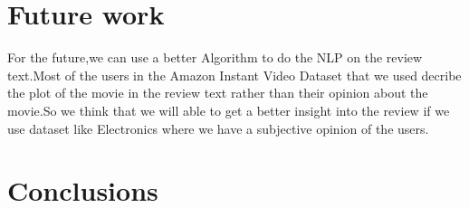 \documentclass{article} %
\begin{document}
\section{Future work}
For the future,we can use a better Algorithm to do the NLP on the review text.Most of the users in the Amazon Instant Video Dataset that
we used decribe the plot of the movie in the review text rather than their opinion about the movie.So we think that we will able to get
a better insight into the review if we use dataset like Electronics where we have a subjective opinion of the users.


\section{Conclusions}
 
 



	
\end{document}

